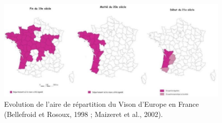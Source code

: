 \documentclass[
  letterpaper,
  DIV=11,
  numbers=noendperiod]{scrreprt}
\begin{document}
\begin{figure}[H]

{\centering \includegraphics{image/evolution_repartition.jpg}

}

\caption{Evolution de l'aire de répartition du Vison d'Europe en France
(Bellefroid et Rosoux, 1998 ; Maizeret et al., 2002).}

\end{figure}%
\end{document}
